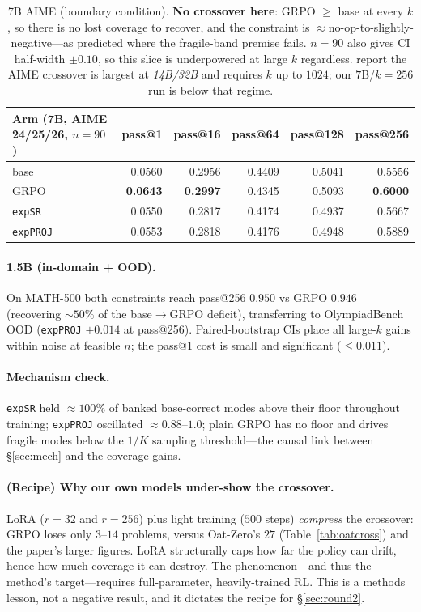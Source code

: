 \documentclass[11pt]{article}
\theoremstyle{definition}
\begin{document}
\begin{table}[h]\centering\small
\begin{tabular}{lrrrrr}
\toprule
Arm (7B, AIME 24/25/26, $n{=}90$) & pass@1 & pass@16 & pass@64 & pass@128 & pass@256\\
\midrule
base                & 0.0560 & 0.2956 & 0.4409 & 0.5041 & 0.5556\\
GRPO                & \textbf{0.0643} & \textbf{0.2997} & 0.4345 & 0.5093 & \textbf{0.6000}\\
\texttt{expSR}      & 0.0550 & 0.2817 & 0.4174 & 0.4937 & 0.5667\\
\texttt{expPROJ}    & 0.0553 & 0.2818 & 0.4176 & 0.4948 & 0.5889\\
\bottomrule
\end{tabular}
\caption{7B AIME (boundary condition). \textbf{No crossover here}: GRPO $\ge$ base at every $k$, so
there is no lost coverage to recover, and the constraint is $\approx$no-op-to-slightly-negative---as
predicted where the fragile-band premise fails. $n{=}90$ also gives CI half-width ${\pm}0.10$, so this
slice is underpowered at large $k$ regardless. \citet{yue2025} report the AIME crossover is largest at
\emph{14B/32B} and requires $k$ up to $1024$; our $7$B/$k{=}256$ run is below that regime.}
\label{tab:aime7b}
\end{table}

\paragraph{1.5B (in-domain + OOD).} On MATH-500 both constraints reach pass@256 $0.950$ vs GRPO
$0.946$ (recovering ${\sim}50\%$ of the base$\to$GRPO deficit), transferring to OlympiadBench OOD
(\texttt{expPROJ} $+0.014$ at pass@256). Paired-bootstrap CIs place all large-$k$ gains within noise
at feasible $n$; the pass@1 cost is small and significant ($\le0.011$).

\paragraph{Mechanism check.} \texttt{expSR} held $\approx100\%$ of banked base-correct modes above
their floor throughout training; \texttt{expPROJ} oscillated $\approx0.88$--$1.0$; plain GRPO has no
floor and drives fragile modes below the $1/K$ sampling threshold---the causal link between
\S\ref{sec:mech} and the coverage gains.

\paragraph{(Recipe) Why our own models under-show the crossover.}
\label{sec:recipe}
LoRA ($r{=}32$ and $r{=}256$) plus light training ($500$ steps) \emph{compress} the crossover: GRPO
loses only $3$--$14$ problems, versus Oat-Zero's $27$ (Table~\ref{tab:oatcross}) and the paper's
larger figures. LoRA structurally caps how far the policy can drift, hence how much coverage it can
destroy. The phenomenon---and thus the method's target---requires full-parameter, heavily-trained RL.
This is a methods lesson, not a negative result, and it dictates the recipe for \S\ref{sec:round2}.
\end{document}
